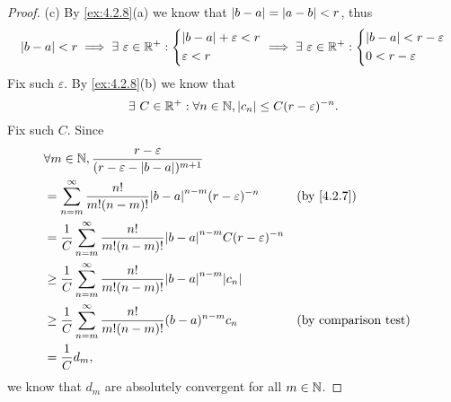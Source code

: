 \begin{proof}{(c)}
  By \cref{ex:4.2.8}(a) we know that \(\left\lvert b - a\right\rvert = \left\lvert a - b\right\rvert < r\), thus
  \[
    \left\lvert b - a\right\rvert < r \implies \exists\ \varepsilon \in \mathbb{R}^+ : \begin{dcases}
      \left\lvert b - a\right\rvert + \varepsilon < r \\
      \varepsilon < r
    \end{dcases} \implies \exists\ \varepsilon \in \mathbb{R}^+ : \begin{dcases}
      \left\lvert b - a\right\rvert < r - \varepsilon \\
      0 < r - \varepsilon
    \end{dcases}
  \]
  Fix such \(\varepsilon\).
  By \cref{ex:4.2.8}(b) we know that
  \[
    \exists\ C \in \mathbb{R}^+ : \forall n \in \mathbb{N}, \left\lvert c_n\right\rvert \leq C (r - \varepsilon)^{-n}.
  \]
  Fix such \(C\).
  Since
  \begin{align*}
     & \forall m \in \N, \dfrac{r - \varepsilon}{(r - \varepsilon - \abs{b - a})^{m + 1}}                                                       \\
     & = \sum_{n = m}^\infty \dfrac{n!}{m! (n - m)!} \abs{b - a}^{n - m} (r - \varepsilon)^{-n}                &  & \text{(by \cref{4.2.7})}    \\
     & = \dfrac{1}{C} \sum_{n = m}^\infty \dfrac{n!}{m! (n - m)!} \abs{b - a}^{n - m} C (r - \varepsilon)^{-n}                                  \\
     & \geq \dfrac{1}{C} \sum_{n = m}^\infty \dfrac{n!}{m! (n - m)!} \abs{b - a}^{n - m} \abs{c_n}                                              \\
     & \geq \dfrac{1}{C} \sum_{n = m}^\infty \dfrac{n!}{m! (n - m)!} (b - a)^{n - m} c_n                       &  & \text{(by comparison test)} \\
     & = \dfrac{1}{C} d_m,
  \end{align*}
  we know that \(d_m\) are absolutely convergent for all \(m \in \mathbb{N}\).
\end{proof}


